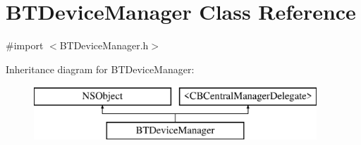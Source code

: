 \hypertarget{interface_b_t_device_manager}{\section{B\-T\-Device\-Manager Class Reference}
\label{interface_b_t_device_manager}
}


{\ttfamily \#import $<$B\-T\-Device\-Manager.\-h$>$}

Inheritance diagram for B\-T\-Device\-Manager\-:\begin{figure}[H]
\begin{center}
\leavevmode
\includegraphics[height=2.000000cm]{interface_b_t_device_manager}
\end{center}
\end{figure}

